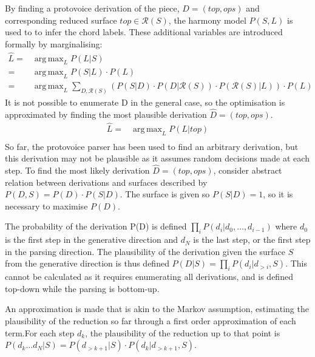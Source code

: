 \documentclass[12pt,a4paper,twoside,openright]{report} \usepackage[pdfborder={0 0 0}]{hyperref}    %
\DeclareMathOperator*{\argmax}{arg\,max} \DeclareMathOperator*{\argmin}{arg\,min}
\theoremstyle{definition} \newtheorem{definition}{Definition}[section]
\begin{document}
By finding a protovoice derivation of the piece, $D= (top, ops)$ and corresponding reduced surface $top \in
\mathcal{R}(S)$, the harmony model $P(S,L)$ is used to to infer the chord labels. These additional variables are
introduced formally by marginalising: \begin{equation} \begin{aligned} \hat{L} =& \argmax_L P(L|S)\\ =& \argmax_L P(S|L)
  \cdot P(L) \\ =& \argmax_L \sum\limits_{D,\mathcal{R}(S)}(P(S|D)\cdot P(D|\mathcal{R}(S))\cdot
  P(\mathcal{R}(S)|L))\cdot P(L) \end{aligned} \label{eq:} \end{equation} It is not possible to enumerate D in the
  general case, so the optimisation is approximated by finding the most plausible derivation $\hat{D} = (top, ops)$.
  \begin{equation} \begin{aligned} \hat{L} =& \argmax_L P(L|top)\\
  \end{aligned} \label{eq:} \end{equation}
  So far, the protovoice parser has been used to find an arbitrary derivation, but this derivation may not be plausible
  as it assumes random decisions made at each step. To find the most likely derivation $\hat{D} = (top, ops)$, consider
  abstract relation between derivations and surfaces described by $P(D, S) = P(D)\cdot P(S|D)$. The surface is given so
  $P(S|D) = 1$, so it is necessary to maximise $P(D)$.

  The probability of the derivation P(D) is defined $\prod_i P(d_i | d_0, \dots, d_{i-1})$ where $d_0$ is the first step
  in the generative direction and $d_N$ is the last step, or the first step in the parsing direction. The plausibility
  of the derivation given the surface $S$ from the generative direction is thus defined $P(D|S) = \prod_{i}P(d_i|d_{>i},
  S)$. This cannot be calculated as it requires enumerating all derivations, and is defined top-down while the parsing
  is bottom-up. 

  An approximation is made that is akin to the Markov assumption, estimating the plausibility of the reduction so far
  through a first order approximation of each term.For each step $d_k$, the plausibility of the reduction up to that
  point is $P(d_k \dots d_N | S) = P(d_{>k+1} | S) \cdot P(d_k | d_{>k+1} , S)$.  
\end{document}

